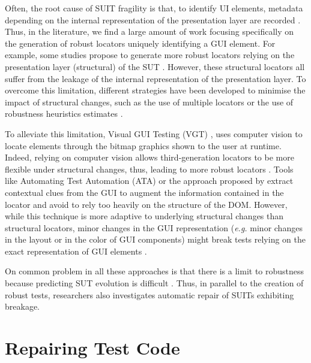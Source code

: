 Often, the root cause of SUIT fragility is that, to identify UI elements, metadata depending on the internal representation of the presentation layer are recorded \cite{Daniel2011, Yandrapally2014, Hammoudi2016}. Thus, in the literature, we find a large amount of work focusing specifically on the generation of robust locators uniquely identifying a GUI element. For example, some studies propose to generate more robust locators relying on the presentation layer (structural) of the SUT \cite{Montoto2011, Leotta2014, Leotta2015, Leotta2016, Zheng2018}. However, these structural locators all suffer from the leakage of the internal representation of the presentation layer. To overcome this limitation, different strategies have been developed to minimise the impact of structural changes, such as the use of multiple locators \cite{Leotta2015, Zheng2018, Long2020} or the use of robustness heuristics estimates \cite{Montoto2011, Leotta2014, Leotta2015, Leotta2015b}.

To alleviate this limitation, Visual GUI Testing (VGT) \cite{Bosch2014}, uses computer vision to locate elements through the bitmap graphics shown to the user at runtime. Indeed, relying on computer vision allows third-generation locators to be more flexible under structural changes, thus, leading to more robust locators \cite{Leotta2014b}. Tools like  Automating Test Automation (ATA) \cite{Thummalapenta2012, Thummalapenta2013} or the approach proposed by \textcite{Yandrapally2014} extract contextual clues from the GUI to augment the information contained in the locator and avoid to rely too heavily on the structure of the DOM. However, while this technique is more adaptive to underlying structural changes than structural locators, minor changes in the GUI representation (\emph{e.g.} minor changes in the layout or in the color of GUI components) might break tests relying on the exact representation of GUI elements \cite{Aldalur2017, Alegroth2018}.

On common problem in all these approaches is that there is a limit to robustness because predicting SUT evolution is difficult \cite{Kirinuki2019}. Thus, in parallel to the creation of robust tests, researchers also investigates automatic repair of SUITs exhibiting breakage.

\section{Repairing Test Code}
\label{sec:related-repair}

